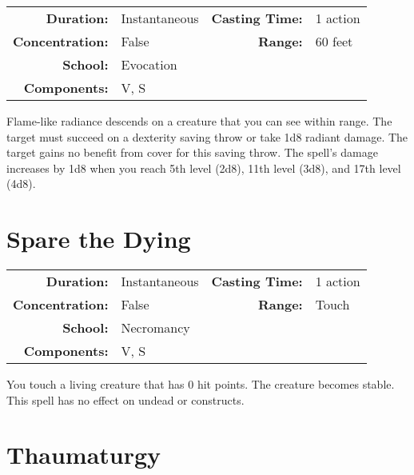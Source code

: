 \documentclass[a5paper, 12pt]{memoir}
\begin{document}
{
\small\centering\vspace{-6pt}
\begin{tabular}{rlrl}
\toprule

\textbf{Duration:} & Instantaneous &
\textbf{Casting Time:} & 1 action \\
\textbf{Concentration:} & False &
\textbf{Range:} & 60 feet \\
\textbf{School:} & Evocation \\
\textbf{Components:} & \multicolumn{3}{p{0.7\textwidth}}{V, S}\\

\bottomrule
\end{tabular}
}

\vspace{1\baselineskip}\noindent Flame-like radiance descends on a creature that you can see within range. The target must succeed on a dexterity saving throw or take 1d8 radiant damage. The target gains no benefit from cover for this saving throw. The spell's damage increases by 1d8 when you reach 5th level (2d8), 11th level (3d8), and 17th level (4d8).

\newpage
\section*{Spare the Dying}

{
\small\centering\vspace{-6pt}
\begin{tabular}{rlrl}
\toprule

\textbf{Duration:} & Instantaneous &
\textbf{Casting Time:} & 1 action \\
\textbf{Concentration:} & False &
\textbf{Range:} & Touch \\
\textbf{School:} & Necromancy \\
\textbf{Components:} & \multicolumn{3}{p{0.7\textwidth}}{V, S}\\

\bottomrule
\end{tabular}
}

\vspace{1\baselineskip}\noindent You touch a living creature that has 0 hit points. The creature becomes stable. This spell has no effect on undead or constructs.

\newpage
\section*{Thaumaturgy}
\end{document}
